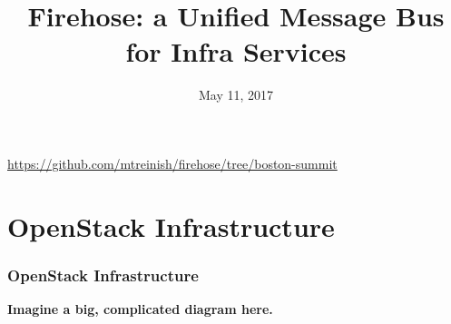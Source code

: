 \documentclass[aspectratio=169,11pt,hyperref={colorlinks=true}]{beamer}
\author[Matthew Treinish & Jeremy Stanley]{%
    \texorpdfstring{%
        \begin{columns}
            \column{.45\linewidth}
            \centering
            Matthew Treinish\\
            \href{mailto:mtreinish@kortar.org}{mtreinish@kortar.org}\\
        \texttt{mtreinish on Freenode}
        \column{.45\linewidth}
            \centering
            Jeremy Stanley\\
            \href{mailto:fungi@yuggoth.org}{fungi@yuggoth.org}\\
            \texttt{fungi on Freenode}
        \end{columns}
        }
    {Matthew Treinish & Jeremy Stanley}
}
\date{May 11, 2017}
\title[Firehose: a Unified Message Bus for Infra Services
\hspace{2em}\insertframenumber/\inserttotalframenumber]{Firehose: a Unified Message Bus for Infra Services}
\begin{document}
{%
\begin{frame}[noframenumbering]
    \hypersetup{colorlinks,urlcolor=white}
    \titlepage{}
    \centering
    \href{https://github.com/mtreinish/firehose/tree/boston-summit}{https://github.com/mtreinish/firehose/tree/boston-summit}
\end{frame}
}

\section{OpenStack Infrastructure}
\begin{frame}
\frametitle{OpenStack Infrastructure}
\centering
\textbf{Imagine a big, complicated diagram here.}
\end{frame}
\end{document}
